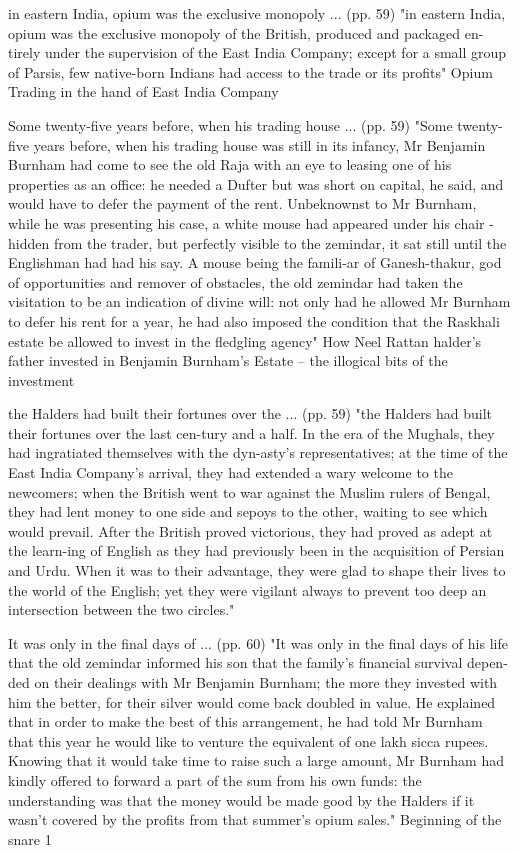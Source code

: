 in eastern India, opium was the exclusive monopoly ... (pp. 59)
"in eastern India, opium was the exclusive monopoly of the British, produced and packaged en-tirely under the supervision of the East India Company; except for a small group of Parsis, few native-born Indians had access to the trade or its profits"
Opium Trading in the hand of East India Company

Some twenty-five years before, when his trading house ... (pp. 59)
"Some twenty-five years before, when his trading house was still in its infancy, Mr Benjamin Burnham had come to see the old Raja with an eye to leasing one of his properties as an office: he needed a Dufter but was short on capital, he said, and would have to defer the payment of the rent. Unbeknownst to Mr Burnham, while he was presenting his case, a white mouse had appeared under his chair - hidden from the trader, but perfectly visible to the zemindar, it sat still until the Englishman had had his say. A mouse being the famili-ar of Ganesh-thakur, god of opportunities and remover of obstacles, the old zemindar had taken the visitation to be an indication of divine will: not only had he allowed Mr Burnham to defer his rent for a year, he had also imposed the condition that the Raskhali estate be allowed to invest in the fledgling agency"
How Neel Rattan halder's father invested in Benjamin Burnham's Estate -- the illogical bits of the investment

the Halders had built their fortunes over the ... (pp. 59)
"the Halders had built their fortunes over the last cen-tury and a half. In the era of the Mughals, they had ingratiated themselves with the dyn-asty’s representatives; at the time of the East India Company’s arrival, they had extended a wary welcome to the newcomers; when the British went to war against the Muslim rulers of Bengal, they had lent money to one side and sepoys to the other, waiting to see which would prevail. After the British proved victorious, they had proved as adept at the learn-ing of English as they had previously been in the acquisition of Persian and Urdu. When it was to their advantage, they were glad to shape their lives to the world of the English; yet they were vigilant always to prevent too deep an intersection between the two circles."

It was only in the final days of ... (pp. 60)
"It was only in the final days of his life that the old zemindar informed his son that the family’s financial survival depen-ded on their dealings with Mr Benjamin Burnham; the more they invested with him the better, for their silver would come back doubled in value. He explained that in order to make the best of this arrangement, he had told Mr Burnham that this year he would like to venture the equivalent of one lakh sicca rupees. Knowing that it would take time to raise such a large amount, Mr Burnham had kindly offered to forward a part of the sum from his own funds: the understanding was that the money would be made good by the Halders if it wasn’t covered by the profits from that summer’s opium sales."
Beginning of the snare 1

